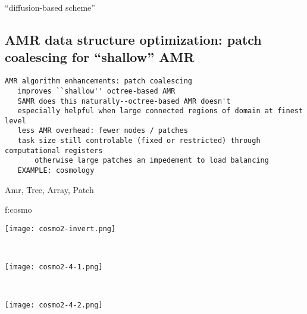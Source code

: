 \documentclass[14pt,letter]{article}
\begin{document}
``diffusion-based scheme''

\subsection{AMR data structure optimization: patch coalescing  for ``shallow'' AMR}

\begin{verbatim}
AMR algorithm enhancements: patch coalescing
   improves ``shallow'' octree-based AMR
   SAMR does this naturally--octree-based AMR doesn't
   especially helpful when large connected regions of domain at finest level
   less AMR overhead: fewer nodes / patches
   task size still controlable (fixed or restricted) through computational registers
       otherwise large patches an impedement to load balancing
   EXAMPLE: cosmology
\end{verbatim}

Amr, Tree, Array, Patch




{f:cosmo}{
\begin{minipage}{7.0in}
\begin{minipage}{2.2in}
\texttt{[image: cosmo2-invert.png]}
\end{minipage} \ 
\begin{minipage}{2.2in}
\texttt{[image: cosmo2-4-1.png]}
\end{minipage} \ 
\begin{minipage}{2.2in}
\texttt{[image: cosmo2-4-2.png]}
\end{minipage}
\end{minipage}
}
\end{document}
